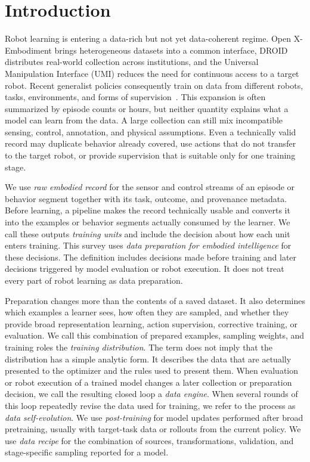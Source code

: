 \section{Introduction}
\label{sec:introduction}

Robot learning is entering a data-rich but not yet data-coherent regime.
Open X-Embodiment brings heterogeneous datasets into a common interface, DROID distributes real-world collection across institutions, and the Universal Manipulation Interface (UMI) reduces the need for continuous access to a target robot.
Recent generalist policies consequently train on data from different robots, tasks, environments, and forms of supervision~\cite{collaboration2023open_2310_08864,khazatsky2024droid_2403_12945,chi2024universal_2402_10329,kim2024openvla_2406_09246,team2024octo_2405_12213}.
This expansion is often summarized by episode counts or hours, but neither quantity explains what a model can learn from the data.
A large collection can still mix incompatible sensing, control, annotation, and physical assumptions.
Even a technically valid record may duplicate behavior already covered, use actions that do not transfer to the target robot, or provide supervision that is suitable only for one training stage.

We use \emph{raw embodied record} for the sensor and control streams of an episode or behavior segment together with its task, outcome, and provenance metadata.
Before learning, a pipeline makes the record technically usable and converts it into the examples or behavior segments actually consumed by the learner.
We call these outputs \emph{training units} and include the decision about how each unit enters training.
This survey uses \emph{data preparation for embodied intelligence} for these decisions.
The definition includes decisions made before training and later decisions triggered by model evaluation or robot execution.
It does not treat every part of robot learning as data preparation.

Preparation changes more than the contents of a saved dataset.
It also determines which examples a learner sees, how often they are sampled, and whether they provide broad representation learning, action supervision, corrective training, or evaluation.
We call this combination of prepared examples, sampling weights, and training roles the \emph{training distribution}.
The term does not imply that the distribution has a simple analytic form.
It describes the data that are actually presented to the optimizer and the rules used to present them.
When evaluation or robot execution of a trained model changes a later collection or preparation decision, we call the resulting closed loop a \emph{data engine}.
When several rounds of this loop repeatedly revise the data used for training, we refer to the process as \emph{data self-evolution}.
We use \emph{post-training} for model updates performed after broad pretraining, usually with target-task data or rollouts from the current policy.
We use \emph{data recipe} for the combination of sources, transformations, validation, and stage-specific sampling reported for a model.

